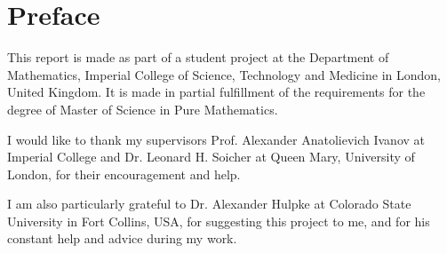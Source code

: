 \chapter*{Preface}

This report is made as part of a student project at the Department of
Mathematics, Imperial College of Science, Technology and Medicine in
London, United Kingdom. It is made in partial fulfillment of the
requirements for the degree of Master of Science in Pure Mathematics.

I would like to thank my supervisors Prof. Alexander Anatolievich
Ivanov at Imperial College and Dr. Leonard H. Soicher at Queen Mary,
University of London, for their encouragement and help.

I am also particularly grateful to Dr. Alexander Hulpke at Colorado
State University in Fort Collins, USA, for suggesting this project to
me, and for his constant help and advice during my work.
